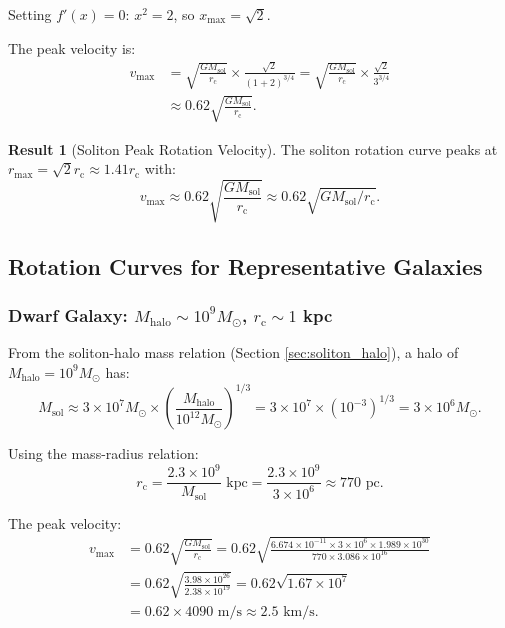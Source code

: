 \documentclass[11pt,a4paper]{article}
\newcommand{\ee}[1]{\times 10^{#1}}
\newcommand{\Msun}{\ensuremath{M_{\odot}}}
\newcommand{\Msol}{\ensuremath{M_{\mathrm{sol}}}}
\newcommand{\Mhalo}{\ensuremath{M_{\mathrm{halo}}}}
\newcommand{\rc}{\ensuremath{r_{\mathrm{c}}}}
\theoremstyle{definition}
\newtheorem{result}{Result}
\theoremstyle{remark}
\begin{document}
Setting $f'(x) = 0$: $x^2 = 2$, so $x_{\max} = \sqrt{2}$.

The peak velocity is:
\begin{align}
v_{\max} &= \sqrt{\frac{G\Msol}{\rc}} \times \frac{\sqrt{2}}{(1+2)^{3/4}} = \sqrt{\frac{G\Msol}{\rc}} \times \frac{\sqrt{2}}{3^{3/4}} \\
&\approx 0.62 \sqrt{\frac{G\Msol}{\rc}}.
\end{align}

\begin{result}[Soliton Peak Rotation Velocity]
The soliton rotation curve peaks at $r_{\max} = \sqrt{2}\rc \approx 1.41 \rc$ with:
\begin{equation}
\boxed{v_{\max} \approx 0.62 \sqrt{\frac{G\Msol}{\rc}} \approx 0.62 \sqrt{G\Msol/\rc}.}
\end{equation}
\end{result}

\subsection{Rotation Curves for Representative Galaxies}
\label{sec:representative}

\subsubsection{Dwarf Galaxy: $\Mhalo \sim 10^9 \Msun$, $\rc \sim 1$ kpc}

From the soliton-halo mass relation (Section \ref{sec:soliton_halo}), a halo of $\Mhalo = 10^9 \Msun$ has:
\begin{equation}
\Msol \approx 3 \times 10^{7} \Msun \times \left(\frac{\Mhalo}{10^{12}\Msun}\right)^{1/3} = 3 \times 10^7 \times (10^{-3})^{1/3} = 3 \times 10^6 \Msun.
\end{equation}

Using the mass-radius relation:
\begin{equation}
\rc = \frac{2.3 \times 10^9}{\Msol} \text{ kpc} = \frac{2.3 \times 10^9}{3 \times 10^6} \approx 770 \text{ pc}.
\end{equation}

The peak velocity:
\begin{align}
v_{\max} &= 0.62 \sqrt{\frac{G\Msol}{\rc}} = 0.62 \sqrt{\frac{6.674 \ee{-11} \times 3 \ee{6} \times 1.989 \ee{30}}{770 \times 3.086 \ee{16}}} \nonumber \\
&= 0.62 \sqrt{\frac{3.98 \ee{26}}{2.38 \ee{19}}} = 0.62 \sqrt{1.67 \ee{7}} \nonumber \\
&= 0.62 \times 4090 \text{ m/s} \approx 2.5 \text{ km/s}.
\end{align}
\end{document}
